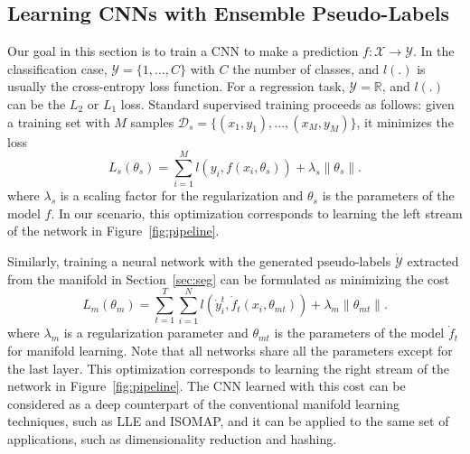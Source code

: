 \documentclass{bmvc2k}
\begin{document}
\subsection{Learning CNNs with Ensemble Pseudo-Labels}
\label{sec:cnntraining}

Our goal in this section is to train a CNN to make a prediction 
$f: \mathcal{X} \rightarrow \mathcal{Y}$. In the classification case, 
$\mathcal{Y} = \{1, ..., C\}$ with $C$ the number of classes, and 
$l(.)$ is usually the cross-entropy loss function. For a regression 
task, $\mathcal{Y}=\mathbb{R}$, and $l(.)$ can be the $L_2$ or $L_1$ 
loss. Standard supervised training proceeds as follows: given a training 
set with $M$ samples $\mathcal{D}_{s}=\{(x_1, y_1), ..., (x_M, y_M)\}$, 
it minimizes the loss  
\begin{equation}
\label{eq:target}
L_s(\theta_{s}) = \sum_{i=1}^M l(y_i, f(x_i, \theta_{s}))  + \lambda_s \|\theta_{s}\|.  
\end{equation}
where $\lambda_s$ is a scaling factor for the regularization and $\theta_{s}$ is the parameters of the model $f$. In our scenario, this optimization corresponds to learning the left stream of the network in Figure~\ref{fig:pipeline}.

Similarly, training a neural network with the generated pseudo-labels 
$\dot{\mathcal{Y}}$ extracted from the manifold in Section~\ref{sec:seg} can be formulated as minimizing the cost 
\begin{equation}
\label{eq:manifold} 
L_m(\theta_{m}) = \sum_{t=1}^T \sum_{i=1}^N l(\dot{y}_{i}^t, \dot{f}_t(x_i, \theta_{mt}))  + \lambda_m \|\theta_{mt}\|. 
\end{equation}
where $\lambda_m$ is a regularization parameter and $\theta_{mt}$ is the parameters of the model $\dot{f}_t$ for manifold learning. Note that all networks share all the parameters except for the last layer.  
This optimization corresponds to learning the right stream of the 
network in Figure~\ref{fig:pipeline}. The CNN learned with this cost can 
be considered as a deep counterpart of the conventional manifold learning 
techniques, such as LLE and ISOMAP, and it can be applied to the same 
set of applications, such as dimensionality reduction and hashing.   
\end{document}
